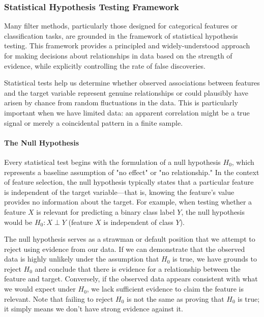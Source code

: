 \subsubsection*{Statistical Hypothesis Testing Framework}

Many filter methods, particularly those designed for categorical features or classification tasks, are grounded in the framework of statistical hypothesis testing. This framework provides a principled and widely-understood approach for making decisions about relationships in data based on the strength of evidence, while explicitly controlling the rate of false discoveries.

Statistical tests help us determine whether observed associations between features and the target variable represent genuine relationships or could plausibly have arisen by chance from random fluctuations in the data. This is particularly important when we have limited data: an apparent correlation might be a true signal or merely a coincidental pattern in a finite sample.

\paragraph{The Null Hypothesis}

Every statistical test begins with the formulation of a null hypothesis $H_0$, which represents a baseline assumption of "no effect" or "no relationship." In the context of feature selection, the null hypothesis typically states that a particular feature is independent of the target variable—that is, knowing the feature's value provides no information about the target. For example, when testing whether a feature $X$ is relevant for predicting a binary class label $Y$, the null hypothesis would be $H_0: X \perp Y$ (feature $X$ is independent of class $Y$).

The null hypothesis serves as a strawman or default position that we attempt to reject using evidence from our data. If we can demonstrate that the observed data is highly unlikely under the assumption that $H_0$ is true, we have grounds to reject $H_0$ and conclude that there is evidence for a relationship between the feature and target. Conversely, if the observed data appears consistent with what we would expect under $H_0$, we lack sufficient evidence to claim the feature is relevant. Note that failing to reject $H_0$ is not the same as proving that $H_0$ is true; it simply means we don't have strong evidence against it.

